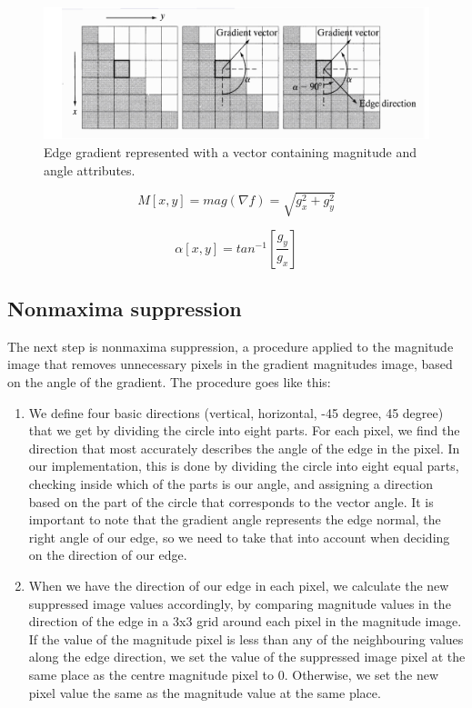 \documentclass[9pt]{IEEEtran}
\begin{document}
\begin{figure}[!htb]
\centering
\includegraphics[width=1\columnwidth]{magnitude_angle.png}
\caption[c1]{ Edge gradient represented with a vector containing magnitude and angle attributes. }
\label{fig_3}
\end{figure}


\begin{equation} \label{eq3}
M[x, y] = mag(\nabla f) = \sqrt{g_x^2 + g_y^2}
 \end{equation}

 \begin{equation} \label{eq4}
\alpha[x, y] = tan^{-1}[\dfrac{g_y}{g_x}]
 \end{equation}

\subsection{Nonmaxima suppression}

The next step is nonmaxima suppression, a procedure applied to the magnitude image that removes unnecessary pixels in the gradient magnitudes image, based on the angle of the gradient. The procedure goes like this:

\begin{enumerate}
\item We define four basic directions (vertical, horizontal, -45 degree, 45 degree) that we get by dividing the circle into eight parts. For each pixel, we find the direction that most accurately describes the angle of the edge in the pixel. In our implementation, this is done by dividing the circle into eight equal parts, checking inside which of the parts is our angle, and assigning a direction based on the part of the circle that corresponds to the vector angle. It is important to note that the gradient angle represents the edge normal, the right angle of our edge, so we need to take that into account when deciding on the direction of our edge.
\item When we have the direction of our edge in each pixel, we calculate the new suppressed image values accordingly, by comparing magnitude values in the direction of the edge in a 3x3 grid around each pixel in the magnitude image. If the value of the magnitude pixel is less than any of the neighbouring values along the edge direction, we set the value of the suppressed image pixel at the same place as the centre magnitude pixel to 0. Otherwise, we set the new pixel value the same as the magnitude value at the same place.
\end{enumerate}
\end{document}
